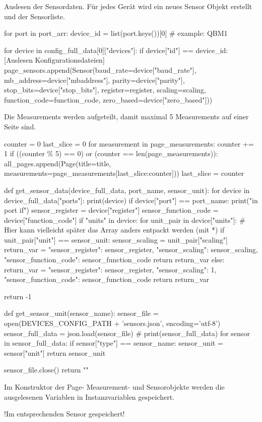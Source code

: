 Auslesen der Sensordaten. Für jedes Gerät wird ein neues Sensor Objekt erstellt und der Sensorliste.
\begin{pythoncode}
for port in port_arr:
	device_id = list(port.keys())[0]  # example: QBM1
	
	for device in config_full_data[0]["devices"]:
		if device["id"] == device_id:
			[Auslesen Konfigurationsdateien]
			page_sensors.append(Sensor(baud_rate=device["baud_rate"], mb_address=device["mbaddress"], parity=device["parity"], stop_bits=device["stop_bits"], register=register, scaling=scaling, function_code=function_code, zero_based=device["zero_based"]))	
\end{pythoncode}

Die Measurements werden aufgeteilt, damit maximal 5 Measurements auf einer Seite sind. 
\begin{pythoncode}
counter = 0
last_slice = 0
for measurement in page_measurements:
	counter += 1
	if ((counter \% 5) == 0) or (counter == len(page_measurements)):
		all_pages.append(Page(title=title, measurements=page_measurements[last_slice:counter]))
		last_slice = counter
\end{pythoncode}


\begin{pythoncode}
def get_sensor_data(device_full_data, port_name, sensor_unit):
	for device in device_full_data["ports"]:
	print(device)
	if device["port"] == port_name:
	print("in port if")
	sensor_register = device["register"]
	sensor_function_code = device["function_code"]
	if "units" in device:
	for unit_pair in device["units"]:  # Hier kann vielleicht später das Array anders entpackt werden (mit *)
	if unit_pair["unit"] == sensor_unit:
	sensor_scaling = unit_pair["scaling"]
	return_var = {"sensor_register": sensor_register, "sensor_scaling": sensor_scaling,
		"sensor_function_code": sensor_function_code}
	return return_var
	else:
	return_var = {"sensor_register": sensor_register, "sensor_scaling": 1,
		"sensor_function_code": sensor_function_code}
	return return_var
	
	
	return -1
	
	
def get_sensor_unit(sensor_name):
	sensor_file = open(DEVICES_CONFIG_PATH + 'sensors.json', encoding='utf-8')
	sensor_full_data = json.load(sensor_file)
	# print(sensor_full_data)
	for sensor in sensor_full_data:
	if sensor["type"] == sensor_name:
	sensor_unit = sensor["unit"]
	return sensor_unit
	
	sensor_file.close()
	return ""
\end{pythoncode}

Im Konstruktor der Page- Measurement- und Sensorobjekte werden die ausgelesenen Variablen in Instanzvariablen gespeichert.


!Im entsprechenden Sensor gespeichert!